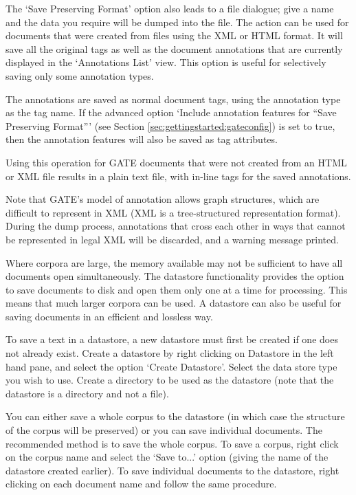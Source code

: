 The `Save Preserving Format' option also leads to a file dialogue; give a name
and the data you require will be dumped into the file. The action can be used for
documents that were created from files using the XML or HTML format. It will save
all the original tags as well as the document annotations that are currently
displayed in the `Annotations List' view. This option is useful for selectively
saving only some annotation types.

The annotations are saved as normal document tags, using the annotation type as
the tag name. If the advanced option `Include annotation features for ``Save
Preserving Format''' (see Section \ref{sec:gettingstarted:gateconfig}) is set
to true, then the annotation features will also be saved as tag attributes.

Using this operation for GATE documents that were not created from an HTML or XML
file results in a plain text file, with in-line tags for the saved annotations.

Note that GATE's model of annotation allows graph structures, which are difficult
to represent in XML (XML is a tree-structured representation format). During the
dump process, annotations that cross each other in ways that cannot be represented
in legal XML will be discarded, and a warning message printed.


Where corpora are large, the memory available may not be sufficient to have all
documents open simultaneously. The datastore functionality provides the option
to save documents to disk and open them only one at a time for
processing. This means that much larger corpora can be used. A datastore can
also be useful for saving documents in an efficient and lossless way. 

To save a text in a datastore, a new datastore must first be created if one
does not already exist. Create a datastore by right clicking on Datastore in
the left hand pane, and select the option `Create Datastore'. Select the data
store type you wish to use. Create a directory to be used as the datastore (note
that the datastore is a directory and not a file).

You can either save a whole corpus to the datastore (in which case the structure
of the corpus will be preserved) or you can save individual documents. The
recommended method is to save the whole corpus. To save a corpus, right click on
the corpus name and select  the `Save to...' option (giving the name of the
datastore created earlier). To save individual documents to the datastore, 
right clicking on each document name and follow the same procedure.

